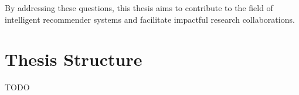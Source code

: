 
By addressing these questions, this thesis aims to contribute to the field of intelligent recommender systems and facilitate impactful research collaborations.

\section{Thesis Structure}\label{sec:thesis-structure}
TODO

